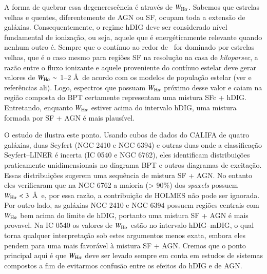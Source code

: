 A forma de quebrar essa degenerescência é através de $W_{\Ha}$. Sabemos que estrelas velhas e quentes, diferentemente de AGN ou SF, ocupam toda a extensão de galáxias.
Consequentemente, o regime hDIG deve ser considerado
nível fundamental de ionização, ou seja, aquele que é energéticamente relevante quando nenhum outro é. Sempre que o contínuo ao redor de \Ha\ for dominado por estrelas velhas, que é o caso mesmo para regiões SF na resolução na casa de {\em kiloparsec}, a razão entre o fluxo ionizante e aquele proveniente do contínuo estelar deve gerar valores de $W_{\Ha} \sim$ 1--2 \AA\ de acordo com os modelos de população estelar (ver \citealt{CidFernandes.etal.2011a} e referências ali). Logo, espectros que possuam $W_{\Ha}$ próximo desse valor e caiam na região composta do BPT certamente representam uma mistura SFc + hDIG. Entretando, enquanto $W_{\Ha}$ estiver acima do intervalo hDIG, uma mistura formada por SF + AGN é mais plausível.

O estudo de \citet{Davies.etal.2014} ilustra este ponto. Usando cubos de dados do CALIFA de quatro galáxias, duas  Seyfert (NGC 2410 e NGC 6394) e outras duas onde a classificação Seyfert--LINER é incerta (IC 0540 e NGC 6762), eles identificam distribuições praticamente unidimensionais no diagrama BPT e outros diagramas de excitação. Essas distribuições sugerem uma sequência de mistura SF + AGN. No entanto eles verificaram que na NGC 6762 a maioria (> 90\%) dos {\em spaxels} possuem $W_{\Ha} < 3$ \AA\ e, por essa razão, a contribuição de HOLMES não pode ser ignorada. Por outro lado, as galáxias NGC 2410 e NGC 6394 possuem regiões centrais com $W_{\Ha}$ bem acima do limite de hDIG, portanto uma mistura SF + AGN é mais provavel. Na IC 0540 os valores de $W_{\Ha}$ estão no intervalo hDIG--mDIG, o qual torna qualquer interpretação sob estes argumentos menos exata, embora eles pendem para uma mais favorável à mistura SF + AGN. Cremos que o ponto principal aqui é que $W_{\Ha}$ deve ser levado sempre em conta em estudos de sistemas compostos a fim de evitarmos confusão entre os efeitos do hDIG e de AGN.



